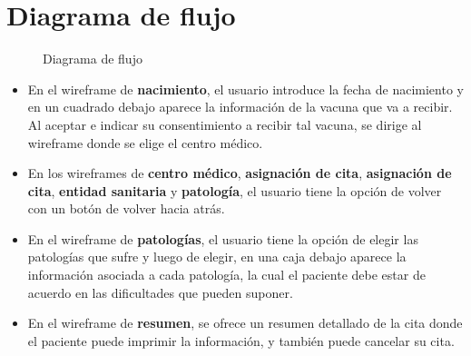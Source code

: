 \documentclass[11pt]{report}
\begin{document}






\tableofcontents
\thispagestyle{fancy}


\chapter{Diagrama de flujo}

\begin{figure}[!ht]
	\centering
	\footnotesize
	
	\normalsize
	\caption{Diagrama de flujo}
\end{figure}

\begin{itemize}
	\item En el wireframe de \textbf{nacimiento}, el usuario introduce la fecha de nacimiento y en un cuadrado debajo
	      aparece la información de la vacuna que va a recibir. Al aceptar e indicar su consentimiento a recibir tal
	      vacuna, se dirige al wireframe donde se elige el centro médico.
	\item En los wireframes de \textbf{centro médico}, \textbf{asignación de cita}, \textbf{asignación de cita},
	      \textbf{entidad sanitaria} y \textbf{patología}, el usuario tiene la opción de volver con un botón de volver
	      hacia atrás.
	\item En el wireframe de \textbf{patologías}, el usuario tiene la opción de elegir las patologías que sufre y
	      luego de elegir, en una caja debajo aparece la información asociada a cada patología, la cual el paciente debe
	      estar de acuerdo en las dificultades que pueden suponer.
	\item En el wireframe de \textbf{resumen}, se ofrece un resumen detallado de la cita donde el paciente puede
	      imprimir la información, y también puede cancelar su cita.
\end{itemize}
\end{document}
